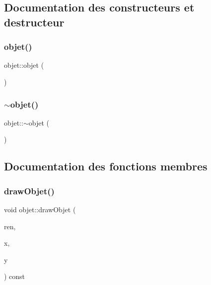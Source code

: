 \subsection{Documentation des constructeurs et destructeur}
\mbox{\label{classobjet_aeda20f498bea2b385904bee3a4151599}} 
\subsubsection{\texorpdfstring{objet()}{objet()}}
{\footnotesize\ttfamily objet\+::objet (\begin{DoxyParamCaption}{ }\end{DoxyParamCaption})}

\mbox{\label{classobjet_a33331c9b9a961c30266616f6080719e1}} 
\subsubsection{\texorpdfstring{$\sim$objet()}{~objet()}}
{\footnotesize\ttfamily objet\+::$\sim$objet (\begin{DoxyParamCaption}{ }\end{DoxyParamCaption})}



\subsection{Documentation des fonctions membres}
\mbox{\label{classobjet_af98e6d209ad98f1f2e3620178e1cb616}} 
\subsubsection{\texorpdfstring{draw\+Objet()}{drawObjet()}}
{\footnotesize\ttfamily void objet\+::draw\+Objet (\begin{DoxyParamCaption}\item[{S\+D\+L\+\_\+\+Renderer $\ast$}]{ren,  }\item[{float}]{x,  }\item[{float}]{y }\end{DoxyParamCaption}) const}

